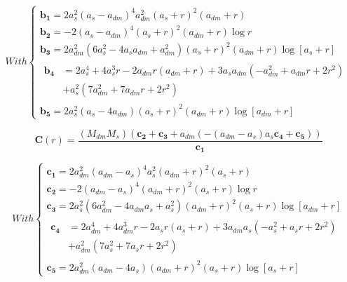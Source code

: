 \begin{equation}
With \left\lbrace
\begin{array}{lllll}
\mathbf{b_{1}}=2a_{s}^{2}(a_{s}-a_{dm})^{4}a_{dm}^{2}(a_{s}+r)^{2}(a_{dm}+r)\\
\mathbf{b_{2}}=-2\left(a_{s}-a_{dm}\right)^{4}\left(a_{s}+r\right)^{2}\left(a_{dm}+r\right)\log{r}\\
\mathbf{b_{3}}=2a_{dm}^{2}\left(6a_{s}^{2}-4a_{s}a_{dm}+a_{dm}^{2}\right)
\left(a_{s}+r\right)^{2}\left(a_{dm}+r\right)\log{[a_{s}+r]}\\
\begin{aligned}	
\mathbf{b_{4}} &= 2a_{s}^{4}+4a_{s}^{3}r-2a_{dm}r(a_{dm}+r)+3a_{s}a_{dm}\left(-a_{dm}^{2}+a_{dm}r+2r^{2}\right)\\      &+a_{s}^{2}\left(7a_{dm}^{2}+7a_{dm}r+2r^{2}\right)
\end{aligned}\\
\mathbf{b_{5}}=2a_{s}^{2}\left(a_{s}-4a_{dm}\right)\left(a_{s}+r\right)^{2}\left(a_{dm}+r\right)\log{[a_{dm}+r]}
\end{array}
\right.
\end{equation} 

\begin{equation}
\textbf{C}(r)=\frac{\left(M_{dm}M_{s}\right)\left(\mathbf{c_{2}}+\mathbf{c_{3}}+a_{dm}\left(-\left(a_{dm}-a_{s}\right)a_{s}\mathbf{c_{4}}+\mathbf{c_{5}}\right)\right)}{\mathbf{c_{1}}}
\end{equation}

\begin{equation}
With \left\lbrace
\begin{array}{lllll}
\mathbf{c_{1}}=2a_{dm}^{2}(a_{dm}-a_{s})^{4}a_{s}^{2}(a_{dm}+r)^{2}(a_{s}+r)\\
\mathbf{c_{2}}=-2\left(a_{dm}-a_{s}\right)^{4}\left(a_{dm}+r\right)^{2}\left(a_{s}+r\right)\log{r}\\
\mathbf{c_{3}}=2a_{s}^{2}\left(6a_{dm}^{2}-4a_{dm}a_{s}+a_{s}^{2}\right)\left(a_{dm}+r\right)^{2}
\left(a_{s}+r\right)\log{[a_{dm}+r]}\\
\begin{aligned}	
\mathbf{c_{4}} &= 2a_{dm}^{4}+4a_{dm}^{3}r-2a_{s}r(a_{s}+r)+3a_{dm}a_{s}\left(-a_{s}^{2}+a_{s}r+2r^{2}\right)\\      &+a_{dm}^{2}\left(7a_{s}^{2}+7a_{s}r+2r^{2}\right)
\end{aligned}\\
\mathbf{c_{5}} =2a_{dm}^{2}\left(a_{dm}-4a_{s}\right)\left(a_{dm}+r\right)^{2}\left(a_{s}+r\right)\log{[a_{s}+r]}
\end{array}
\right.
\end{equation} 

